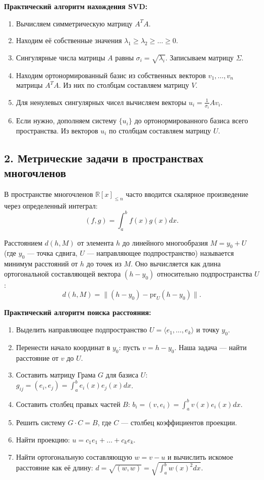 \noindent\textbf{Практический алгоритм нахождения SVD:}
\begin{enumerate}
    \item Вычисляем симметрическую матрицу $A^T A$.
    \item Находим её собственные значения $\lambda_1 \ge \lambda_2 \ge \dots \ge 0$.
    \item Сингулярные числа матрицы $A$ равны $\sigma_i = \sqrt{\lambda_i}$. Записываем матрицу $\Sigma$.
    \item Находим ортонормированный базис из собственных векторов $v_1, \dots, v_n$ матрицы $A^T A$. Из них по столбцам составляем матрицу $V$.
    \item Для ненулевых сингулярных чисел вычисляем векторы $u_i = \frac{1}{\sigma_i} A v_i$.
    \item Если нужно, дополняем систему $\{u_i\}$ до ортонормированного базиса всего пространства. Из векторов $u_i$ по столбцам составляем матрицу $U$.
\end{enumerate}


\subsection*{2. Метрические задачи в пространствах многочленов}

В пространстве многочленов $\mathbb{R}[x]_{\le n}$ часто вводится скалярное произведение через определенный интеграл:
\[
(f, g) = \int_a^b f(x)g(x)dx.
\]

\begin{definition}
Расстоянием $d(h, M)$ от элемента $h$ до линейного многообразия $M = y_0 + U$ (где $y_0$ — точка сдвига, $U$ — направляющее подпространство) называется минимум расстояний от $h$ до точек из $M$. Оно вычисляется как длина ортогональной составляющей вектора $(h - y_0)$ относительно подпространства $U$:
\[
d(h, M) = \| (h - y_0) - \text{pr}_U(h - y_0) \|.
\]
\end{definition}

\noindent\textbf{Практический алгоритм поиска расстояния:}
\begin{enumerate}
    \item Выделить направляющее подпространство $U = \langle e_1, \dots, e_k \rangle$ и точку $y_0$.
    \item Перенести начало координат в $y_0$: пусть $v = h - y_0$. Наша задача — найти расстояние от $v$ до $U$.
    \item Составить матрицу Грама $G$ для базиса $U$: $g_{ij} = (e_i, e_j) = \int_a^b e_i(x) e_j(x)dx$.
    \item Составить столбец правых частей $B$: $b_i = (v, e_i) = \int_a^b v(x) e_i(x)dx$.
    \item Решить систему $G \cdot C = B$, где $C$ — столбец коэффициентов проекции.
    \item Найти проекцию: $u = c_1 e_1 + \dots + c_k e_k$.
    \item Найти ортогональную составляющую $w = v - u$ и вычислить искомое расстояние как её длину: $d = \sqrt{(w, w)} = \sqrt{\int_a^b w(x)^2 dx}$.
\end{enumerate}


